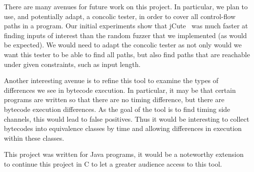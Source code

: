 
There are many avenues for future work on this project. In particular, 
we plan to use, and potentially adapt, a concolic tester, in order to
cover all control-flow paths in a program. Our initial experiments
show that jCute~\cite{conf/cav/SenA06} was much faster
at finding inputs of interest than the random fuzzer that we
implemented (as would be expected). We would need to adapt the
concolic tester as not only would we want this tester to
be able to find all paths, but also find paths that are reachable under
given constraints, such as input length. 

Another interesting avenue is to refine this tool to examine the types
of differences we see in bytecode execution. In particular, it may be
that certain programs are written so that there are no timing
difference, but there are bytecode execution differences. As the goal
of the tool is to find timing side channels, this would lead to
false positives. Thus it would be interesting to 
collect bytecodes into equivalence classes by time and allowing
differences in execution within these classes. 

This project was written for Java programs, it would be a noteworthy
extension to continue this project in C to let a greater audience
access to this tool. 
